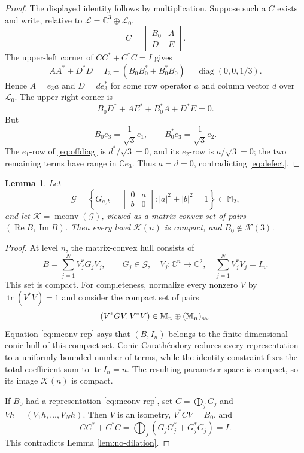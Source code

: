 \documentclass[11pt]{article}
\newtheorem{lemma}{Lemma}
\newcommand{\C}{\mathbb C}
\newcommand{\M}{\mathbb M}
\newcommand{\K}{\mathcal K}
\newcommand{\G}{\mathcal G}
\newcommand{\Rea}{\operatorname{Re}}
\newcommand{\Ima}{\operatorname{Im}}
\newcommand{\mconv}{\operatorname{mconv}}
\begin{document}
\begin{proof}
The displayed identity follows by multiplication. Suppose such a \(C\)
exists and write, relative to \(\mathcal L=\C^3\oplus\mathcal L_0\),
\[
C=\begin{bmatrix}B_0&A\\D&E\end{bmatrix}.
\]
The upper-left corner of \(CC^*+C^*C=I\) gives
\begin{equation}\label{eq:defect}
 AA^*+D^*D
 =I_3-(B_0B_0^*+B_0^*B_0)
 =\operatorname{diag}(0,0,1/3).
\end{equation}
Hence \(A=e_3a\) and \(D=de_3^*\) for some row operator \(a\) and
column vector \(d\) over \(\mathcal L_0\). The upper-right corner is
\begin{equation}\label{eq:offdiag}
 B_0D^*+AE^*+B_0^*A+D^*E=0.
\end{equation}
But
\[
 B_0e_3=\frac1{\sqrt3}e_1,
 \qquad B_0^*e_3=\frac1{\sqrt3}e_2.
\]
The \(e_1\)-row of \eqref{eq:offdiag} is \(d^*/\sqrt3=0\), and its
\(e_2\)-row is \(a/\sqrt3=0\); the two remaining terms have range in
\(\C e_3\). Thus \(a=d=0\), contradicting \eqref{eq:defect}.
\end{proof}

\begin{lemma}\label{lem:compact}
Let
\[
 \G=\left\{G_{a,b}=\begin{bmatrix}0&a\\b&0\end{bmatrix}:
 |a|^2+|b|^2=1\right\}\subset\M_2,
\]
and let \(\K=\mconv(\G)\), viewed as a matrix-convex set of pairs
\((\Rea B,\Ima B)\). Then every level \(\K(n)\) is compact, and
\(B_0\notin\K(3)\).
\end{lemma}

\begin{proof}
At level \(n\), the matrix-convex hull consists of
\begin{equation}\label{eq:mconv-rep}
 B=\sum_{j=1}^N V_j^*G_jV_j,
 \qquad G_j\in\G,\quad V_j:\C^n\to\C^2,\quad
 \sum_{j=1}^N V_j^*V_j=I_n.
\end{equation}
This set is compact. For completeness, normalize every nonzero \(V\) by
\(\operatorname{tr}(V^*V)=1\) and consider the compact set of pairs
\[
 (V^*GV,V^*V)\in \M_n\oplus(\M_n)_{\rm sa}.
\]
Equation \eqref{eq:mconv-rep} says that \((B,I_n)\) belongs to the
finite-dimensional conic hull of this compact set. Conic Carath\'eodory
reduces every representation to a uniformly bounded number of terms, while
the identity constraint fixes the total coefficient sum to
\(\operatorname{tr}I_n=n\). The resulting parameter space is compact, so
its image \(\K(n)\) is compact.

If \(B_0\) had a representation \eqref{eq:mconv-rep}, set
\(C=\bigoplus_jG_j\) and \(Vh=(V_1h,\ldots,V_Nh)\). Then \(V\) is an
isometry, \(V^*CV=B_0\), and
\[
 CC^*+C^*C=\bigoplus_j(G_jG_j^*+G_j^*G_j)=I.
\]
This contradicts Lemma \ref{lem:no-dilation}.
\end{proof}
\end{document}
